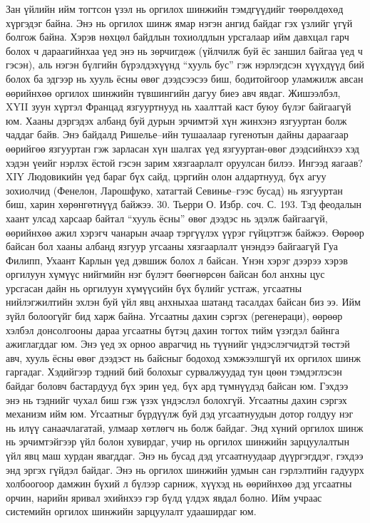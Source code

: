 Зан үйлийн ийм тогтсон үзэл нь оргилох шинжийн тэмдгүүдийг төөрөлдөхөд хүргэдэг байна. Энэ нь оргилох шинж ямар нэгэн ангид байдаг гэх үзлийг үгүй болгож байна. Хэрэв нөхцөл байдлын тохиолдлын урсгалаар ийм давхцал гарч болох ч дараагийнхаа үед энэ нь зөрчигдөж (үйлчилж буй ёс заншил байгаа үед ч гэсэн), аль нэгэн бүлгийн бүрэлдэхүүнд “хууль бус” гэж нэрлэгдсэн хүүхдүүд бий болох ба эдгээр нь хууль ёсны өвөг дээдсээсээ биш, бодитойгоор уламжилж авсан өөрийнхөө оргилох шинжийн түвшингийн дагуу биеэ авч явдаг.
Жишээлбэл, XYII зуун хүртэл Францад язгууртнууд нь хаалттай каст буюу бүлэг байгаагүй юм. Хааны дэргэдэх албанд буй дурын эрчимтэй хүн жинхэнэ язгууртан болж чаддаг байв. Энэ байдалд Ришелье–ийн тушаалаар гугенотын дайны дараагаар өөрийгөө язгууртан гэж зарласан хүн шалгах үед язгууртан-өвөг дээдсийнхээ хэд хэдэн үеийг нэрлэх ёстой гэсэн зарим хязгаарлалт оруулсан билээ. Ингээд яагаав? XIY Людовикийн үед бараг бүх сайд, цэргийн олон алдартнууд, бүх агуу зохиолчид (Фенелон, Ларошфуко, хатагтай Севинье–гээс бусад) нь язгууртан биш, харин хөрөнгөтнүүд байжээ. 30. Тьерри О. Избр. соч. С. 193.
Тэд феодалын хаант улсад харсаар байтал “хууль ёсны” өвөг дээдэс нь эдэлж байгаагүй, өөрийнхөө ажил хэрэгч чанарын ачаар тэргүүлэх үүрэг гүйцэтгэж байжээ. Өөрөөр байсан бол хааны албанд язгуур угсааны хязгаарлалт үнэндээ байгаагүй Гуа Филипп, Ухаант Карлын үед дэвшиж болох л байсан. Үнэн хэрэг дээрээ хэрэв оргилуун хүмүүс нийгмийн нэг бүлэгт бөөгнөрсөн байсан бол анхны цус урсгасан дайн нь оргилуун хүмүүсийн бүх бүлийг устгаж, угсаатны нийлэгжилтийн эхлэн буй үйл явц анхныхаа шатанд тасалдах байсан биз ээ. Ийм зүйл болоогүйг бид харж байна.
Угсаатны дахин сэргэх (регенераци), өөрөөр хэлбэл донсолгооны дараа угсаатны бүтэц дахин тогтох тийм үзэгдэл байнга ажиглагддаг юм. Энэ үед эх орноо аврагчид нь түүнийг үндэслэгчидтэй төстэй авч, хууль ёсны өвөг дээдэст нь байсныг бодоход хэмжээлшгүй их оргилох шинж гаргадаг. Хэдийгээр тэдний бий болохыг сурвалжуудад тун цөөн тэмдэглэсэн байдаг боловч бастардууд бүх эрин үед, бүх ард түмнүүдэд байсан юм. Гэхдээ энэ нь тэднийг чухал биш гэж үзэх үндэслэл болохгүй.
Угсаатны дахин сэргэх механизм ийм юм. Угсаатныг бүрдүүлж буй дэд угсаатнуудын дотор голдуу нэг нь илүү санаачлагатай, улмаар хөтлөгч нь болж байдаг. Энд хүний оргилох шинж нь эрчимтэйгээр үйл болон хувирдаг, учир нь оргилох шинжийн зарцуулалтын үйл явц маш хурдан явагддаг. Энэ нь бусад дэд угсаатнуудаар дүүргэгддэг, гэхдээ энд эргэх гүйдэл байдаг. Энэ нь оргилох шинжийн удмын сан гэрлэлтийн гадуурх холбоогоор дамжин бүхий л бүлээр сарниж, хүүхэд нь өөрийнхөө дэд угсаатны орчин, нарийн яривал эхийнхээ гэр бүлд үлдэх явдал болно. Ийм учраас системийн оргилох шинжийн зарцуулалт удааширдаг юм.
